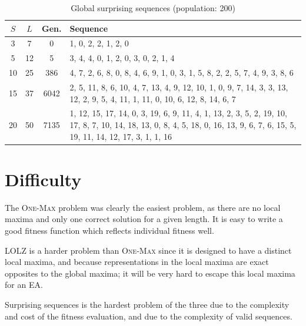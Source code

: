 \begin{table}
{\tiny
\begin{tabularx}{\textwidth}{cccX}
\toprule
$S$ & $L$ & Gen. & Sequence \\
\midrule
3 & 7 & 0 & 1, 0, 2, 2, 1, 2, 0 \\
5 & 12 & 5 & 3, 4, 4, 0, 1, 2, 0, 3, 0, 2, 1, 4 \\
10 & 25 & 386 & 4, 7, 2, 6, 8, 0, 8, 4, 6, 9, 1, 0, 3, 1, 5, 8, 2, 2, 5, 7, 4, 9, 3, 8, 6 \\
15 & 37 & 6042 & 2, 5, 11, 8, 6, 10, 4, 7, 13, 4, 9, 12, 10, 1, 0, 9, 7, 14, 3, 3, 13, 12, 2, 9, 5, 4, 11, 1, 11, 0, 10, 6, 12, 8, 14, 6, 7 \\
20 & 50 & 7135 & 1, 12, 15, 17, 14, 0, 3, 19, 6, 9, 11, 4, 1, 13, 2, 3, 5, 2, 19, 10, 17, 8, 7, 10, 14, 18, 13, 0, 8, 4, 5, 18, 0, 16, 13, 9, 6, 7, 6, 15, 5, 19, 11, 14, 12, 17, 3, 1, 1, 16 \\
\bottomrule
\end{tabularx}
}
\caption{Global surprising sequences (population: 200)}
\label{table:local_surprising}
\end{table}

\section*{Difficulty}

The \textsc{One-Max} problem was clearly the easiest problem, as there are no local maxima and only one correct solution for a given length. It is easy to write a good fitness function which reflects individual fitness well.

\textsc{LOLZ} is a harder problem than \textsc{One-Max} since it is designed to have a distinct local maxima, and because representations in the local maxima are exact opposites to the global maxima; it will be very hard to escape this local maxima for an \ac{EA}.

Surprising sequences is the hardest problem of the three due to the complexity and cost of the fitness evaluation, and due to the complexity of valid sequences.



